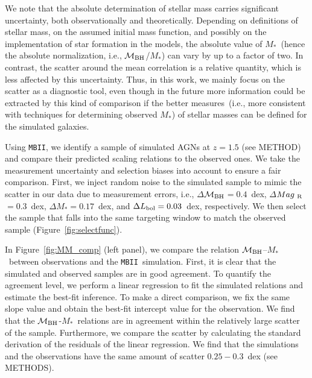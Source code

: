 \documentclass{natureprintstyle}
\newcommand{\mbh}{$\mathcal M_{\rm BH}$}
\newcommand{\mr}{$Mag_{\rm ~R}$}
\newcommand{\mstar}{{$M_*$}}
\newcommand{\mbii}{\texttt{MBII}}
\begin{document}
We note that the absolute determination of stellar mass carries significant uncertainty, both observationally and theoretically. Depending on definitions of stellar mass, on the assumed initial mass function, and possibly on the implementation of star formation in the models, the absolute value of \mstar\ (hence the absolute normalization, i.e., \mbh/\mstar) can vary by up to a factor of two. In contrast, the scatter around the mean correlation is a relative quantity, which is less affected by this uncertainty. Thus, in this work, we mainly focus on the scatter as a diagnostic tool, even though in the future more information could be extracted by this kind of comparison if the %
better measures~(i.e., more consistent with techniques for determining observed \mstar) of stellar masses can be defined for the simulated galaxies.

Using \mbii, we identify a sample of simulated AGNs at $z=1.5$ (see METHOD) and compare their predicted scaling relations to the observed ones. We take the measurement uncertainty and selection biases into account to ensure a fair comparison. First, we inject random noise to the simulated sample to mimic the scatter in our data due to measurement errors, i.e., $\Delta$\mbh $=0.4$~dex, $\Delta$\mr$=0.3$~dex, $\Delta$\mstar$=0.17$~dex, and $\Delta L_{\rm bol}=0.03$~dex, respectively. We then select the sample that falls into the same targeting window to match the observed sample (Figure~\ref{fig:selectfunc}). 

In Figure~\ref{fig:MM_comp} (left panel), we compare the relation \mbh--\mstar~between observations and the \mbii\ simulation. First, it is clear that the simulated and observed samples are in good agreement. To quantify the agreement level, we perform a linear regression to fit the simulated relations and estimate the best-fit inference. To make a direct comparison, we fix the same slope value and obtain the best-fit intercept value for the observation. We find that the \mbh-\mstar\ relations are in agreement within the relatively large scatter of the sample. Furthermore, we compare the scatter by calculating the standard derivation of the residuals of the linear regression. We find that the simulations and the observations have the same amount of scatter $0.25-0.3$~dex (see METHODS).
\end{document}
